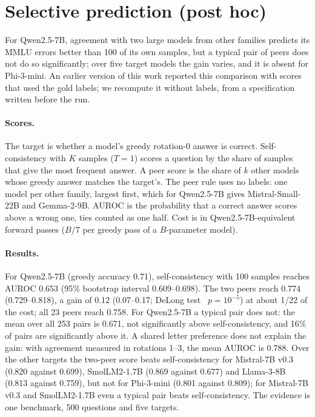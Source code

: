 \documentclass{article}
\theoremstyle{plain}
\theoremstyle{remark}
\begin{document}
\section{Selective prediction (post hoc)}
\label{app:selective}

For Qwen2.5-7B, agreement with two large models from other families
predicts its MMLU errors better than 100 of its own samples, but a
typical pair of peers does not do so significantly; over five target models the gain varies,
and it is absent for Phi-3-mini. An earlier
version of this work reported this comparison with scores that used the
gold labels; we recompute it without labels, from a specification
written before the run.

\paragraph{Scores.} The target is whether a model's greedy rotation-0
answer is correct. Self-consistency with $K$ samples ($T=1$) scores a
question by the share of samples that give the most frequent answer. A
peer score is the share of $k$ other models whose greedy answer matches
the target's. The peer rule uses no labels: one model per other family,
largest first, which for Qwen2.5-7B gives Mistral-Small-22B and
Gemma-2-9B. AUROC is the probability that a correct answer
scores above a wrong one, ties counted as one half. Cost is in Qwen2.5-7B-equivalent forward passes ($B/7$ per
greedy pass of a $B$-parameter model).

\paragraph{Results.} For Qwen2.5-7B (greedy accuracy 0.71),
self-consistency with 100 samples reaches AUROC 0.653 (95\% bootstrap
interval 0.609--0.698). The two peers reach 0.774 (0.729--0.818), a
gain of 0.12 (0.07--0.17; DeLong test~\citep{delong1988} $p=10^{-5}$) at about 1/22 of the
cost; all 23 peers reach 0.758. For Qwen2.5-7B a typical pair does not: the
mean over all 253 pairs is 0.671, not significantly above
self-consistency, and 16\% of pairs are significantly above it. A shared letter preference
does not explain the gain: with agreement measured in rotations 1--3,
the mean AUROC is 0.788. Over the other targets the two-peer score beats self-consistency
for Mistral-7B v0.3 (0.820 against 0.699), SmolLM2-1.7B (0.869 against
0.677) and Llama-3-8B (0.813 against 0.759), but not for Phi-3-mini
(0.801 against 0.809); for Mistral-7B v0.3 and SmolLM2-1.7B even a
typical pair beats self-consistency. The evidence is one benchmark, 500 questions and
five targets.
\end{document}
